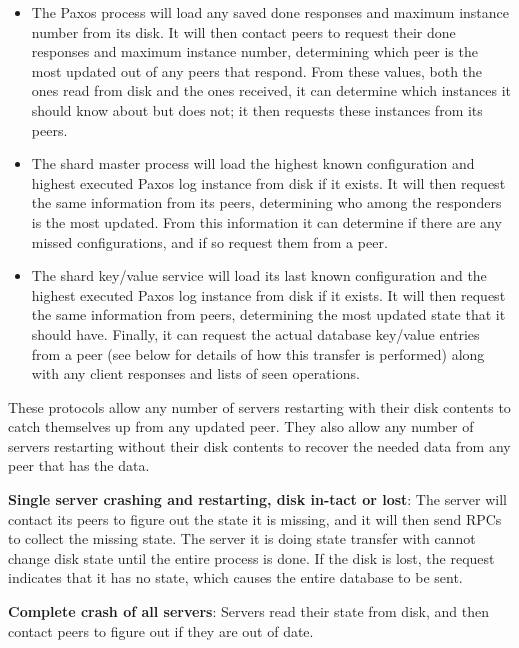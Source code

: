 \documentclass[letterpaper,10pt]{article}
\begin{document}
\begin{itemize}
\item The Paxos process will load any saved done responses and maximum
  instance number from its disk.  It will then contact peers to
  request their done responses and maximum instance number,
  determining which peer is the most updated out of any peers that
  respond.  From these values, both the ones read from disk and the
  ones received, it can determine which instances it should know about
  but does not; it then requests these instances from its peers.
\item The shard master process will load the highest known
  configuration and highest executed Paxos log instance from disk if
  it exists.  It will then request the same information from its
  peers, determining who among the responders is the most updated.
  From this information it can determine if there are any missed
  configurations, and if so request them from a peer.
\item The shard key/value service will load its last known
  configuration and the highest executed Paxos log instance from disk
  if it exists.  It will then request the same information from peers,
  determining the most updated state that it should have.  Finally, it
  can request the actual database key/value entries from a peer (see
  below for details of how this transfer is performed) along with any
  client responses and lists of seen operations.
\end{itemize}
These protocols allow any number of servers restarting with their disk
contents to catch themselves up from any updated peer.  They also
allow any number of servers restarting without their disk contents to
recover the needed data from any peer that has the data.

\textbf{Single server crashing and restarting, disk in-tact or lost}:
The server will contact its peers to figure out the state it is
missing, and it will then send RPCs to collect the missing state. The
server it is doing state transfer with cannot change disk state until
the entire process is done. If the disk is lost, the request indicates
that it has no state, which causes the entire database to be sent.

\textbf{Complete crash of all servers}: Servers read their state from
disk, and then contact peers to figure out if they are out of date. 


\end{document}
